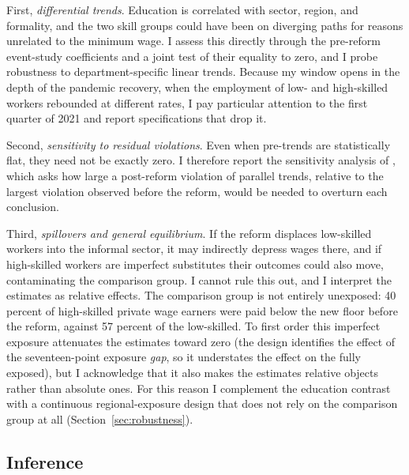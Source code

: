 First, \emph{differential trends}. Education is correlated with sector, region, and formality, and the two skill groups could have been on diverging paths for reasons unrelated to the minimum wage. I assess this directly through the pre-reform event-study coefficients and a joint test of their equality to zero, and I probe robustness to department-specific linear trends. Because my window opens in the depth of the pandemic recovery, when the employment of low- and high-skilled workers rebounded at different rates, I pay particular attention to the first quarter of 2021 and report specifications that drop it.

Second, \emph{sensitivity to residual violations}. Even when pre-trends are statistically flat, they need not be exactly zero. I therefore report the sensitivity analysis of \citet{rambachan_roth_2023}, which asks how large a post-reform violation of parallel trends, relative to the largest violation observed before the reform, would be needed to overturn each conclusion.

Third, \emph{spillovers and general equilibrium}. If the reform displaces low-skilled workers into the informal sector, it may indirectly depress wages there, and if high-skilled workers are imperfect substitutes their outcomes could also move, contaminating the comparison group. I cannot rule this out, and I interpret the estimates as relative effects. The comparison group is not entirely unexposed: 40 percent of high-skilled private wage earners were paid below the new floor before the reform, against 57 percent of the low-skilled. To first order this imperfect exposure attenuates the estimates toward zero (the design identifies the effect of the seventeen-point exposure \emph{gap}, so it understates the effect on the fully exposed), but I acknowledge that it also makes the estimates relative objects rather than absolute ones. For this reason I complement the education contrast with a continuous regional-exposure design that does not rely on the comparison group at all (Section~\ref{sec:robustness}).

\subsection{Inference}

